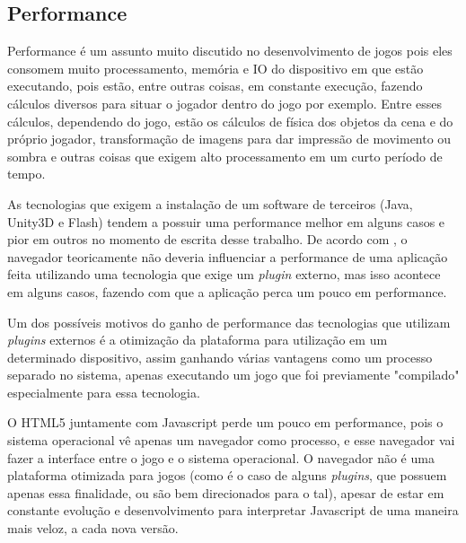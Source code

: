 \subsection{Performance}

Performance é um assunto muito discutido no desenvolvimento de jogos
pois eles consomem muito processamento, memória e IO do dispositivo em que estão
executando, pois estão, entre outras coisas, em constante execução, fazendo
cálculos diversos para situar o jogador dentro do jogo por exemplo.
Entre esses cálculos, dependendo do jogo, estão os cálculos de física dos
objetos da cena e do próprio jogador, transformação de imagens para
dar impressão de movimento ou sombra e outras coisas que exigem alto
processamento em um curto período de tempo.

As tecnologias que exigem a instalação de um software de terceiros
(Java, Unity3D e Flash) tendem a possuir uma performance melhor em alguns casos
e pior em outros no momento de escrita desse trabalho. De acordo com ,
o navegador teoricamente não deveria influenciar a performance de uma aplicação
feita utilizando uma tecnologia que exige um \textit{plugin} externo, mas isso acontece
em alguns casos, fazendo com que a aplicação perca um pouco em performance.

Um dos possíveis motivos do ganho de performance das tecnologias que
utilizam \textit{plugins} externos é a otimização da plataforma para utilização em um determinado
dispositivo, assim ganhando várias vantagens como um processo separado no
sistema, apenas executando um jogo que foi previamente "compilado"
especialmente para essa tecnologia.

O HTML5 juntamente com Javascript perde um pouco em performance, pois
o sistema operacional vê apenas um navegador como processo, e esse
navegador vai fazer a interface entre o jogo e o sistema operacional.
O navegador não é uma plataforma otimizada para jogos (como é o caso
de alguns \textit{plugins}, que possuem apenas essa finalidade, ou são bem
direcionados para o tal), apesar de estar em constante evolução e
desenvolvimento para interpretar Javascript de uma maneira mais veloz,
a cada nova versão.

